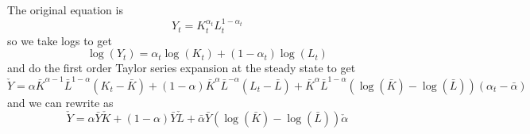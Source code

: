 \documentclass[11pt]{amsart}
\begin{document}
\subsection{}

\subsection{}
The original equation is
\[
Y_t = K_t^{\alpha_t} L_t^{1-\alpha_t}
\]
so we take logs to get
\[
\log(Y_t) = \alpha_t \log(K_t) + (1-\alpha_t) \log(L_t)
\]
and do the first order Taylor series expansion at the steady state to get
\[
\check{Y} = \alpha  \bar{K}^{\alpha -1} \bar{L}^{1-\alpha } (K_t - \bar{K}) + (1-\alpha ) \bar{K}^{\alpha } \bar{L}^{-\alpha } (L_t - \bar{L}) + \bar{K}^{\alpha } \bar{L}^{1-\alpha } (\log(\bar{K}) - \log(\bar{L})) (\alpha_t - \bar{\alpha})
\]
and we can rewrite as 
\[
\check{Y} = \alpha \bar{Y} \check{K} + (1-\alpha) \bar{Y} \check{L} + \bar{\alpha} \bar{Y} (\log(\bar{K}) - \log(\bar{L})) \check{\alpha}
\]
\end{document}
